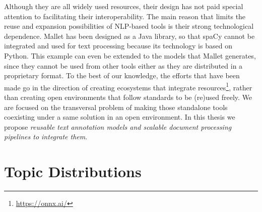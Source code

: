 Although they are all widely used resources, their design has not paid special attention to facilitating their interoperability. The main reason that limits the reuse and expansion possibilities of NLP-based tools is their strong technological dependence. Mallet has been designed as a Java library, so that spaCy cannot be integrated and used for text processing because its technology is based on Python. This example can even be extended to the models that Mallet generates, since they cannot be used from other tools either as they are distributed in a proprietary format. To the best of our knowledge, the efforts that have been made go in the direction of creating ecosystems that integrate resources\footnote{\url{https://onnx.ai/}}, rather than creating open environments that follow standards to be (re)used freely. We are focused on the transversal problem of making those standalone tools coexisting under a same solution in an open environment. In this thesis we propose \textit{reusable text annotation models and scalable document processing pipelines to integrate them}.  
 

\section{Topic Distributions}\label{ch:soa_topics}

